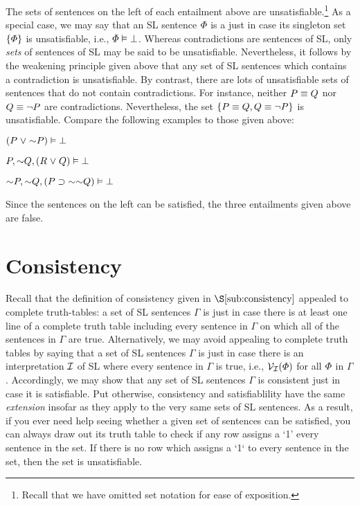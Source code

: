 The sets of sentences on the left of each entailment above are unsatisfiable.\footnote{Recall that we have omitted set notation for ease of exposition.}
As a special case, we may say that an SL sentence $\varPhi$ is a  just in case its singleton set $\lbrace\varPhi\rbrace$ is unsatisfiable, i.e., $\varPhi \vDash \bot$.
Whereas contradictions are sentences of SL, only \textit{sets} of sentences of SL may be said to be unsatisfiable.
Nevertheless, it follows by the weakening principle given above that any set of SL sentences which contains a contradiction is unsatisfiable.
By contrast, there are lots of unsatisfiable sets of sentences that do not contain contradictions.
For instance, neither $P \equiv Q$ nor $Q \equiv \neg P$ are contradictions. 
Nevertheless, the set $\lbrace P \equiv Q, Q \equiv \neg P\rbrace$ is unsatisfiable. 
Compare the following examples to those given above:

\begin{earg}
\item[] $(P \eor \enot P) \models\bot$
\item[] $P, \enot Q, (R \eor Q) \models\bot$
\item[] $\enot P, \enot Q, (P \eif \enot\enot Q) \models\bot$
\end{earg}

Since the sentences on the left can be satisfied, the three entailments given above are false.



\section{Consistency}
  \label{sec:consistency}

Recall that the definition of consistency given in $\S\ref{sub:consistency}$ appealed to complete truth-tables: a set of SL sentences $\Gamma$ is  just in case there is at least one line of a complete truth table including every sentence in $\Gamma$ on which all of the sentences in $\Gamma$ are true.
Alternatively, we may avoid appealing to complete truth tables by saying that a set of SL sentences $\Gamma$ is  just in case there is an interpretation $\mathcal{I}$ of SL where every sentence in $\Gamma$ is true, i.e., $\mathcal{V}_{\mathcal{I}}(\varPhi)$ for all $\varPhi$ in $\Gamma$.\label{def.consistencySL}
Accordingly, we may show that any set of SL sentences $\Gamma$ is consistent just in case it is satisfiable. 
Put otherwise, consistency and satisfiablility have the same \textit{extension} insofar as they apply to the very same sets of SL sentences.
As a result, if you ever need help seeing whether a given set of sentences can be satisfied, you can always draw out its truth table to check if any row assigns a `1' every sentence in the set.
If there is no row which assigns a `1` to every sentence in the set, then the set is unsatisfiable.




